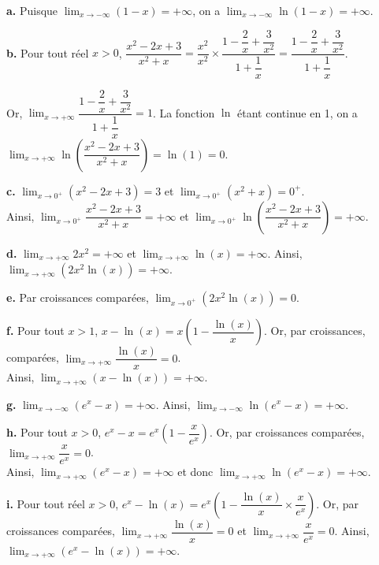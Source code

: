 \documentclass[11pt,fleqn, openany]{book} %
\begin{document}
\begin{solution}\textbf{a.} Puisque $\displaystyle\lim_{x\to - \infty} (1-x)=+\infty$, on a $\displaystyle\lim_{x\to - \infty} \ln(1-x)=+\infty$.

\textbf{b.} Pour tout réel $x>0$, $\dfrac{x^2-2x+3}{x^2+x} = \dfrac{x^2}{x^2} \times \dfrac{1-\dfrac{2}{x}+\dfrac{3}{x^2}}{1+\dfrac{1}{x}} = \dfrac{1-\dfrac{2}{x}+\dfrac{3}{x^2}}{1+\dfrac{1}{x}}$.

 Or, $\displaystyle \lim_{x \to + \infty} \dfrac{1-\dfrac{2}{x}+\dfrac{3}{x^2}}{1+\dfrac{1}{x}} = 1$. La fonction $\ln$ étant continue en 1, on a $\displaystyle\lim_{x \to +\infty}\ln\left(\dfrac{x^2-2x+3}{x^2+x}\right)=\ln(1)=0$.

\textbf{c.} $\displaystyle\lim_{x \to 0^+}(x^2-2x+3)=3$ et $\displaystyle\lim_{x \to 0^+}(x^2+x)=0^+$.\\ Ainsi, $\displaystyle\lim_{x \to 0^+}\dfrac{x^2-2x+3}{x^2+x} = +\infty$ et $\displaystyle\lim_{x \to 0^+}\ln\left(\dfrac{x^2-2x+3}{x^2+x}\right) = +\infty$.
 
\textbf{d.} $\displaystyle\lim_{x \to +\infty}2x^2=+\infty$ et $\displaystyle\lim_{x \to +\infty}\ln(x)=+\infty$. Ainsi, $\displaystyle\lim_{x \to +\infty} (2x^2\ln(x))=+\infty$.
 
\textbf{e.} Par croissances comparées, $\displaystyle\lim_{x \to 0^+}(2x^2\ln(x))=0$.

\textbf{f.} Pour tout $x>1$, $x-\ln(x) = x\left(1-\dfrac{\ln(x)}{x}\right)$. Or, par croissances, comparées, $\displaystyle\lim_{x \to +\infty} \dfrac{\ln(x)}{x}=0$. \\ Ainsi, $\displaystyle\lim_{x \to +\infty} (x-\ln(x))=+\infty$.

\textbf{g.} $\displaystyle\lim_{x \to -\infty} (e^x-x)=+\infty$. Ainsi, $\displaystyle\lim_{x \to -\infty} \ln(e^x-x)=+\infty$.
 
\textbf{h.} Pour tout $x>0$, $e^x-x=e^x\left(1-\dfrac{x}{e^x}\right)$. Or, par croissances comparées, $\displaystyle\lim_{x \to +\infty} \dfrac{x}{e^x}=0$. \\ Ainsi, $\displaystyle\lim_{x \to +\infty} (e^x-x)=+\infty$ et donc $\displaystyle\lim_{x \to +\infty}\ln(e^x-x)=+\infty$.

\textbf{i.}  Pour tout réel $x>0$, $e^x-\ln(x)=e^x\left(1-\dfrac{\ln(x)}{x} \times \dfrac{x}{e^x}\right)$. Or, par croissances comparées, $\displaystyle\lim_{x \to +\infty} \dfrac{\ln(x)}{x}=0$ et $\displaystyle\lim_{x \to +\infty} \dfrac{x}{e^x}=0$. Ainsi, $\displaystyle\lim_{x \to +\infty}(e^x-\ln(x))=+\infty$.\end{solution}
\end{document}
